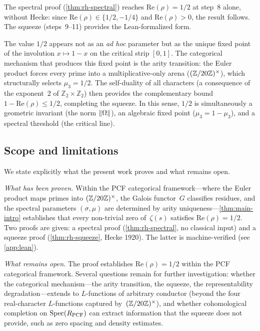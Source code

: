 The spectral proof (\cref{thm:rh-spectral}) reaches
$\mathrm{Re}(\rho)=1/2$ at step~8 alone, without Hecke: since
$\mathrm{Re}(\rho)\in\{1/2,-1/4\}$ and $\mathrm{Re}(\rho)>0$, the
result follows.  The squeeze (steps~9--11) provides the Lean-formalized
form.

\begin{Remark}\label{rmk:why-half}
The value $1/2$ appears not as an \emph{ad hoc} parameter but as the
unique fixed point of the involution $x\mapsto 1-x$ on the critical
strip $[0,1]$.  The categorical mechanism that produces this fixed point
is the arity transition: the Euler product forces every prime into a
multiplicative-only arena ($(\mathbb{Z}/20\mathbb{Z})^\times$), which structurally selects
$\mu_3 = 1/2$.  The self-duality of all characters (a consequence of
the exponent~$2$ of $\mathbb{Z}_2\times\mathbb{Z}_2$) then provides the
complementary bound $1-\mathrm{Re}(\rho)\le 1/2$, completing the
squeeze.  In this sense, $1/2$ is simultaneously a geometric invariant
(the norm $\|\Omega\|$), an algebraic fixed point
($\mu_3=1-\mu_3$), and a spectral threshold (the critical line).
\end{Remark}

\subsection{Scope and limitations}\label{ssec:scope}

We state explicitly what the present work proves and what remains
open.

\emph{What has been proven.}  Within the PCF categorical framework---where
the Euler product maps primes into $(\mathbb{Z}/20\mathbb{Z})^\times$, the Galois functor~$G$
classifies residues, and the spectral parameters $(\sigma,\mu)$ are
determined by arity uniqueness---\cref{thm:main-intro}
establishes that every non-trivial zero of~$\zeta(s)$ satisfies
$\mathrm{Re}(\rho)=1/2$.  Two proofs are given: a spectral proof
(\cref{thm:rh-spectral}, no classical input) and a squeeze
proof (\cref{thm:rh-squeeze}, Hecke 1920). The latter is machine-verified (see \cref{app:lean}).

\emph{What remains open.}  The proof establishes
$\mathrm{Re}(\rho)=1/2$ within the PCF categorical framework.
Several questions remain for further investigation: whether the
categorical mechanism---the arity transition, the squeeze, the
representability degradation---extends to $L$-functions of arbitrary
conductor (beyond the four real-character $L$-functions captured
by~$(\mathbb{Z}/20\mathbb{Z})^\times$), and whether cohomological completion on
$\mathrm{Spec}(R_{\mathrm{PCF}})$ can extract information that the squeeze does
not provide, such as zero spacing and density estimates.

